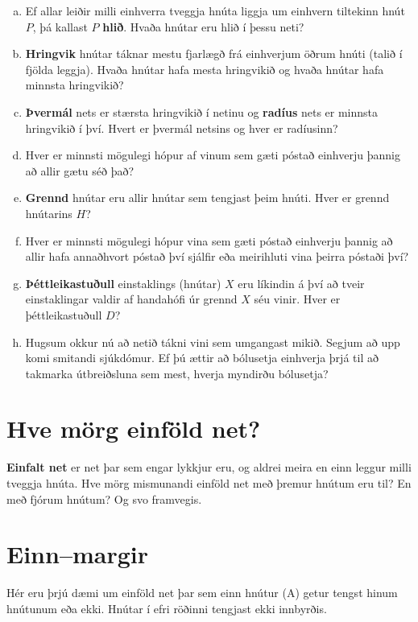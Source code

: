 \documentclass[b5paper,12pt]{book}
\begin{document}
\begin{enumerate}[(a)]
    \item Ef allar leiðir milli einhverra tveggja hnúta liggja um einhvern tiltekinn hnút $P$, þá kallast $P$ \textbf{hlið}. Hvaða hnútar eru hlið í þessu neti?
    \item \textbf{Hringvik} hnútar táknar mestu fjarlægð frá einhverjum öðrum hnúti (talið í fjölda leggja). Hvaða hnútar hafa mesta hringvikið og hvaða hnútar hafa minnsta hringvikið?
    \item \textbf{Þvermál} nets er stærsta hringvikið í netinu og \textbf{radíus} nets er minnsta hringvikið í því. Hvert er þvermál netsins og hver er radíusinn?
    \item Hver er minnsti mögulegi hópur af vinum sem gæti póstað einhverju þannig að allir gætu séð það?
    \item \textbf{Grennd} hnútar eru allir hnútar sem tengjast þeim hnúti. Hver er grennd hnútarins $H$?
    \item Hver er minnsti mögulegi hópur vina sem gæti póstað einhverju þannig að allir hafa annaðhvort póstað því sjálfir eða meirihluti vina þeirra póstaði því?
    \item \textbf{Þéttleikastuðull} einstaklings (hnútar) $X$ eru líkindin á því að tveir einstaklingar valdir af handahófi úr grennd $X$ séu vinir. Hver er þéttleikastuðull $D$?
    \item Hugsum okkur nú að netið tákni vini sem umgangast mikið. Segjum að upp komi smitandi sjúkdómur. Ef þú ættir að bólusetja einhverja þrjá til að takmarka útbreiðsluna sem mest, hverja myndirðu bólusetja?
\end{enumerate}

\section{Hve mörg einföld net?}
\textbf{Einfalt net} er net þar sem engar lykkjur eru, og aldrei meira en einn leggur milli tveggja hnúta.
Hve mörg mismunandi einföld net með þremur hnútum eru til? En með fjórum hnútum? Og svo framvegis. 

\section{Einn--margir}
Hér eru þrjú dæmi um einföld net þar sem einn hnútur (A) getur tengst hinum hnútunum eða ekki. Hnútar í efri röðinni tengjast ekki innbyrðis.
\end{document}
